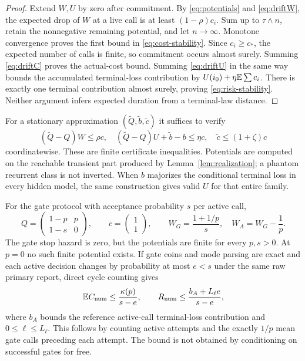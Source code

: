 \begin{proof}
Extend $W,U$ by zero after commitment. By \eqref{eq:potentials} and \eqref{eq:driftW}, the expected drop of $W$ at a live call is at least $(1-\rho)c_i$. Sum up to $\tau\wedge n$, retain the nonnegative remaining potential, and let $n\to\infty$. Monotone convergence proves the first bound in \eqref{eq:cost-stability}. Since $c_i\ge c_*$, the expected number of calls is finite, so commitment occurs almost surely. Summing \eqref{eq:driftC} proves the actual-cost bound. Summing \eqref{eq:driftU} in the same way bounds the accumulated terminal-loss contribution by $U(i_0)+\eta\mathbb E\sum c_i$. There is exactly one terminal contribution almost surely, proving \eqref{eq:risk-stability}. Neither argument infers expected duration from a terminal-law distance.
\end{proof}

For a stationary approximation $(\widetilde Q,\widetilde b,\widetilde c)$ it suffices to verify
\[
 (\widetilde Q-Q)W\le\rho c,\quad
 (\widetilde Q-Q)U+\widetilde b-b\le\eta c,\quad
 \widetilde c\le(1+\zeta)c
\]
coordinatewise. These are finite certificate inequalities. Potentials are computed on the reachable transient part produced by Lemma~\ref{lem:realization}; a phantom recurrent class is not inverted. When $b$ majorizes the conditional terminal loss in every hidden model, the same construction gives valid $U$ for that entire family.

\begin{example}\label{ex:gate-drift}
For the gate protocol with acceptance probability $s$ per active call,
\[
 Q=\begin{pmatrix}1-p&p\\1-s&0\end{pmatrix},\qquad
 c=\begin{pmatrix}1\\1\end{pmatrix},\qquad
 W_G=\frac{1+1/p}{s},\quad W_A=W_G-\frac1p.
\]
The gate stop hazard is zero, but the potentials are finite for every $p,s>0$. At $p=0$ no such finite potential exists. If gate coins and mode parsing are exact and each active decision changes by probability at most $e<s$ under the same raw primary report, direct cycle counting gives
\[
 \mathbb E C_{\rm num}\le\frac{\kappa(p)}{s-e},\qquad
 R_{\rm num}\le\frac{b_A+L_\ell e}{s-e},
\]
where $b_A$ bounds the reference active-call terminal-loss contribution and $0\le\ell\le L_\ell$. This follows by counting active attempts and the exactly $1/p$ mean gate calls preceding each attempt. The bound is not obtained by conditioning on successful gates for free.
\end{example}

